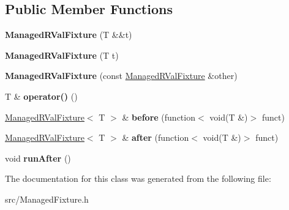 \subsection*{Public Member Functions}
\begin{DoxyCompactItemize}
\item 
\hypertarget{class_managed_r_val_fixture_abfbd7fabbbffe76a54ea70282120d451}{{\bfseries Managed\-R\-Val\-Fixture} (T \&\&t)}\label{class_managed_r_val_fixture_abfbd7fabbbffe76a54ea70282120d451}

\item 
\hypertarget{class_managed_r_val_fixture_aacb6499f9c66bf37547a750a538fde5e}{{\bfseries Managed\-R\-Val\-Fixture} (T t)}\label{class_managed_r_val_fixture_aacb6499f9c66bf37547a750a538fde5e}

\item 
\hypertarget{class_managed_r_val_fixture_a0484b27d970b3730f94757e41d4acf5a}{{\bfseries Managed\-R\-Val\-Fixture} (const \hyperlink{class_managed_r_val_fixture}{Managed\-R\-Val\-Fixture} \&other)}\label{class_managed_r_val_fixture_a0484b27d970b3730f94757e41d4acf5a}

\item 
\hypertarget{class_managed_r_val_fixture_a74c672037e2be5b21acc436435a6650e}{T \& {\bfseries operator()} ()}\label{class_managed_r_val_fixture_a74c672037e2be5b21acc436435a6650e}

\item 
\hypertarget{class_managed_r_val_fixture_aa831d925813794aa2f4d45b1f386247d}{\hyperlink{class_managed_r_val_fixture}{Managed\-R\-Val\-Fixture}$<$ T $>$ \& {\bfseries before} (function$<$ void(T \&)$>$ funct)}\label{class_managed_r_val_fixture_aa831d925813794aa2f4d45b1f386247d}

\item 
\hypertarget{class_managed_r_val_fixture_a5d78d81790a3532cdb914845e1ce1777}{\hyperlink{class_managed_r_val_fixture}{Managed\-R\-Val\-Fixture}$<$ T $>$ \& {\bfseries after} (function$<$ void(T \&)$>$ funct)}\label{class_managed_r_val_fixture_a5d78d81790a3532cdb914845e1ce1777}

\item 
\hypertarget{class_managed_r_val_fixture_a562a4f2e7c01cfa4844efae9ec0ea588}{void {\bfseries run\-After} ()}\label{class_managed_r_val_fixture_a562a4f2e7c01cfa4844efae9ec0ea588}

\end{DoxyCompactItemize}


The documentation for this class was generated from the following file\-:\begin{DoxyCompactItemize}
\item 
src/Managed\-Fixture.\-h\end{DoxyCompactItemize}
